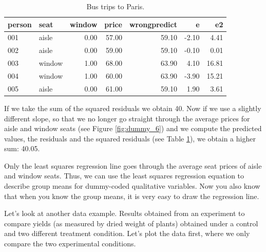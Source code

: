 \documentclass[]{report}\usepackage[]{graphicx}\usepackage[]{color}
\begin{document}
\begin{table}[ht]
\centering
\caption{Bus trips to Paris.} 
\label{tab:dummy_7}
\begin{tabular}{llrrrrr}
  \hline
person & seat & window & price & wrongpredict & e & e2 \\ 
  \hline
001 & aisle & 0.00 & 57.00 & 59.10 & -2.10 & 4.41 \\ 
  002 & aisle & 0.00 & 59.00 & 59.10 & -0.10 & 0.01 \\ 
  003 & window & 1.00 & 68.00 & 63.90 & 4.10 & 16.81 \\ 
  004 & window & 1.00 & 60.00 & 63.90 & -3.90 & 15.21 \\ 
  005 & aisle & 0.00 & 61.00 & 59.10 & 1.90 & 3.61 \\ 
   \hline
\end{tabular}
\end{table}


If we take the sum of the squared residuals we obtain 40. Now if we use a slightly different slope, so that we no longer go straight through the average prices for aisle and window seats (see Figure \ref{fig:dummy_6}) and we compute the predicted values, the residuals and the squared residuals (see Table \ref{tab:dummy_7}), we obtain a higher sum: 40.05. 

Only the least squares regression line goes through the average seat prices of aisle and window seats. Thus, we can use the least squares regression equation to describe group means for dummy-coded qualitative variables. Now you also know that when you know the group means, it is very easy to draw the regression line. 


Let's look at another data example. Results obtained from an experiment to compare yields (as measured by dried weight of plants) obtained under a control and two different treatment condition. Let's plot the data first, where we only compare the two experimental conditions.
\end{document}
